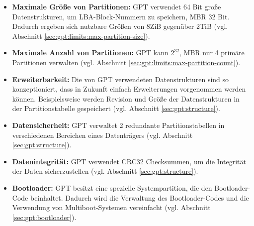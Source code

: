 \begin{itemize}
    \item \textbf{Maximale Größe von Partitionen:}
    GPT verwendet 64 Bit große Datenstrukturen, um LBA-Block-Nummern zu speichern, MBR 32 Bit.
    Dadurch ergeben sich nutzbare Größen von 8ZiB gegenüber 2TiB (vgl. Abschnitt \ref{sec:gpt:limits:max-partition-size}).

    \item \textbf{Maximale Anzahl von Partitionen:}
    GPT kann $ 2^{32} $, MBR nur 4 primäre Partitionen verwalten (vgl. Abschnitt \ref{sec:gpt:limits:max-partition-count}).

    \item \textbf{Erweiterbarkeit:}
    Die von GPT verwendeten Datenstrukturen sind so konzeptioniert, dass in Zukunft einfach Erweiterungen vorgenommen werden können.
    Beispielsweise werden Revision und Größe der Datenstrukturen in der Partitionstabelle gespeichert (vgl. Abschnitt \ref{sec:gpt:structure}).

    \item \textbf{Datensicherheit:} 
    GPT verwaltet 2 redundante Partitionstabellen in verschiedenen Bereichen eines Datenträgers (vgl. Abschnitt \ref{sec:gpt:structure}).
    
    \item \textbf{Datenintegrität:}
    GPT verwendet CRC32 Checksummen, um die Integrität der Daten sicherzustellen (vgl. Abschnitt \ref{sec:gpt:structure}).

    \item \textbf{Bootloader:}
    GPT besitzt eine spezielle Systempartition, die den Bootloader-Code beinhaltet.
    Dadurch wird die Verwaltung des Bootloader-Codes und die Verwendung von Multiboot-Systemen vereinfacht (vgl. Abschnitt \ref{sec:gpt:bootloader}).

\end{itemize}
